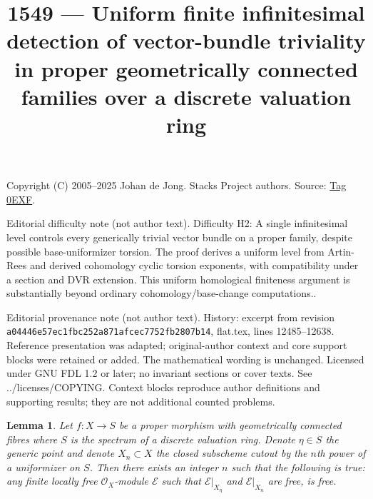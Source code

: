 \documentclass{amsart}
\theoremstyle{plain}
\newtheorem{lemma}[subsection]{Lemma}
\theoremstyle{definition}
\theoremstyle{remark}
\numberwithin{equation}{subsection}
\begin{document}
\title[Stacks Project, Tag 0EXF]{1549 --- Uniform finite infinitesimal detection of vector-bundle triviality in proper geometrically connected families over a discrete valuation ring}
\maketitle
\noindent Copyright (C) 2005--2025 Johan de Jong. Stacks Project authors. Source: \href{https://stacks.math.columbia.edu/tag/0EXF}{Tag 0EXF}.

\noindent Editorial difficulty note (not author text). Difficulty H2: A single infinitesimal level controls every generically trivial vector bundle on a proper family, despite possible base-uniformizer torsion. The proof derives a uniform level from Artin-Rees and derived cohomology cyclic torsion exponents, with compatibility under a section and DVR extension. This uniform homological finiteness argument is substantially beyond ordinary cohomology/base-change computations..

\noindent Editorial provenance note (not author text). History: excerpt from revision \texttt{a0444\allowbreak 6e57e\allowbreak c1fbc\allowbreak 252a8\allowbreak 71afc\allowbreak ec775\allowbreak 2fb28\allowbreak 07b14}, flat.tex, lines 12485--12638. Reference presentation was adapted; original-author context and core support blocks were retained or added. The mathematical wording is unchanged. Licensed under GNU FDL 1.2 or later; no invariant sections or cover texts. See ../licenses/COPYING. Context blocks reproduce author definitions and supporting results; they are not additional counted problems.

\begin{lemma}
\label{lemma-trivial-fibres-dvr}
Let $f : X \to S$ be a proper morphism with geometrically connected fibres
where $S$ is the spectrum of a discrete valuation ring. Denote $\eta \in S$
the generic point and denote $X_n \subset X$ the closed subscheme
cutout by the $n$th power of a uniformizer on $S$.
Then there exists
an integer $n$ such that the following is true: any finite
locally free $\mathcal{O}_X$-module $\mathcal{E}$
such that $\mathcal{E}|_{X_\eta}$ and $\mathcal{E}|_{X_n}$
are free, is free.
\end{lemma}
\end{document}
